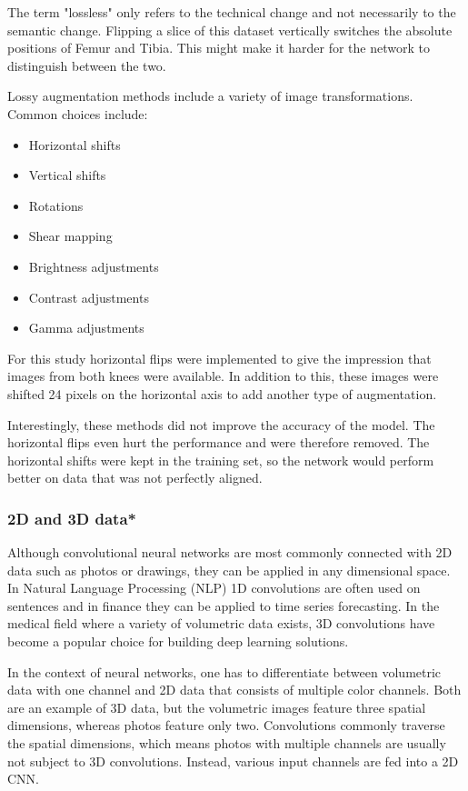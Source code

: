 The term "lossless" only refers to the technical change and not necessarily to the semantic change. Flipping a slice of this dataset vertically switches the absolute positions of Femur and Tibia. This might make it harder for the network to distinguish between the two.

Lossy augmentation methods include a variety of image transformations. Common choices include:

\begin{itemize}
\item Horizontal shifts
\item Vertical shifts
\item Rotations
\item Shear mapping
\item Brightness adjustments
\item Contrast adjustments
\item Gamma adjustments
\end{itemize}

For this study horizontal flips were implemented to give the impression that images from both knees were available. In addition to this, these images were shifted 24 pixels on the horizontal axis to add another type of augmentation. 

Interestingly, these methods did not improve the accuracy of the model. The horizontal flips even hurt the performance and were therefore removed. The horizontal shifts were kept in the training set, so the network would perform better on data that was not perfectly aligned.

\subsubsection{2D and 3D data*}

Although convolutional neural networks are most commonly connected with 2D data such as photos or drawings, they can be applied in any dimensional space. In Natural Language Processing (NLP) 1D convolutions are often used on sentences and in finance they can be applied to time series forecasting. In the medical field where a variety of volumetric data exists, 3D convolutions have become a popular choice for building deep learning solutions.

In the context of neural networks, one has to differentiate between volumetric data with one channel and 2D data that consists of multiple color channels. Both are an example of 3D data, but the volumetric images feature three spatial dimensions, whereas photos feature only two. Convolutions commonly traverse the spatial dimensions, which means photos with multiple channels are usually not subject to 3D convolutions. Instead, various input channels are fed into a 2D CNN.

